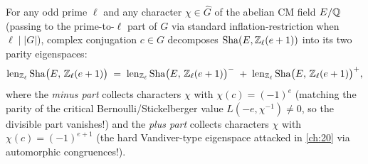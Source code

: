 For any odd prime $\ell$ and any character $\chi \in \widehat{G}$ of the abelian CM field $E/\mathbb{Q}$ (passing to the prime-to-$\ell$ part of $G$ via standard inflation-restriction when $\ell \mid |G|$), complex conjugation $c \in G$ decomposes $\mathrm{Sha}(E, \mathbb{Z}_\ell(e+1))$ into its two parity eigenspaces:
\begin{equation}
\label{eq:19:parity-split}
  \operatorname{len}_{\mathbb{Z}_\ell}\mathrm{Sha}\bigl(E,\, \mathbb{Z}_\ell(e+1)\bigr)
  \;=\; \operatorname{len}_{\mathbb{Z}_\ell}\mathrm{Sha}\bigl(E,\, \mathbb{Z}_\ell(e+1)\bigr)^{-}
  \;+\; \operatorname{len}_{\mathbb{Z}_\ell}\mathrm{Sha}\bigl(E,\, \mathbb{Z}_\ell(e+1)\bigr)^{+},
\end{equation}
where the \emph{minus part} collects characters $\chi$ with $\chi(c) = (-1)^e$ (matching the parity of the critical Bernoulli/Stickelberger value $L(-e, \chi^{-1}) \neq 0$, so the divisible part vanishes!) and the \emph{plus part} collects characters $\chi$ with $\chi(c) = (-1)^{e+1}$ (the hard Vandiver-type eigenspace attacked in \cref{ch:20} via automorphic congruences!).

